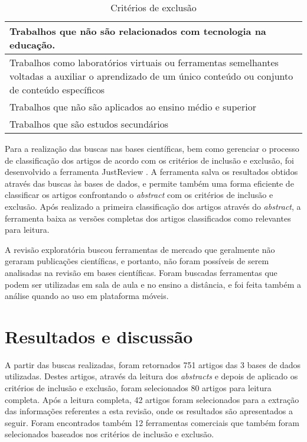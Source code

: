 \bgroup
\def\arraystretch{1.5} %
\begin{table}[h]{} %
\centering
\begin{tabular}{ | p{14cm}| } \hline
Trabalhos que não são relacionados com tecnologia na educação. \\ \hline
Trabalhos como laboratórios virtuais ou ferramentas semelhantes voltadas a auxiliar o aprendizado de um único conteúdo ou conjunto de conteúdo específicos \\ \hline
Trabalhos que não são aplicados ao ensino médio e superior \\ \hline
Trabalhos que são estudos secundários \\ \hline
\end{tabular}
\caption{Critérios de exclusão}
\label{tab:criteriosExclusao}
\end{table}
\egroup

Para a realização das buscas nas bases científicas, bem como gerenciar o processo de classificação dos artigos de acordo com os critérios de inclusão e exclusão, foi desenvolvido a ferramenta JustReview \cite{justreview_artigo}. A ferramenta salva os resultados obtidos através das buscas às bases de dados, e permite também uma forma eficiente de classificar os artigos confrontando o \emph{abstract} com os critérios de inclusão e exclusão. Após realizado a primeira classificação dos artigos através do \emph{abstract}, a ferramenta baixa as versões completas dos artigos classificados como relevantes para leitura.

A revisão exploratória buscou ferramentas de mercado que geralmente não geraram publicações científicas, e portanto, não foram possíveis de serem analisadas na revisão em bases científicas. Foram buscadas ferramentas que podem ser utilizadas em sala de aula e no ensino a distância, e foi feita também a análise quando ao uso em plataforma móveis.

\section{Resultados e discussão}

A partir das buscas realizadas, foram retornados 751 artigos das 3 bases de dados utilizadas. Destes artigos, através da leitura dos \emph{abstracts} e depois de aplicado os critérios de inclusão e exclusão, foram selecionados 80 artigos para leitura completa. Após a leitura completa, 42 artigos foram selecionados para a extração das informações referentes a esta revisão, onde os resultados são apresentados a seguir. Foram encontrados também 12 ferramentas comerciais que também foram selecionados baseados nos critérios de inclusão e exclusão.

